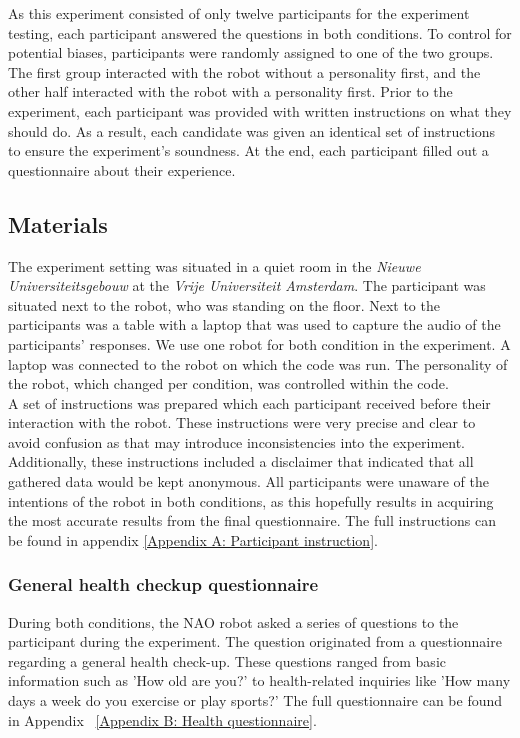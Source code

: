 \documentclass[runningheads]{llncs}
\begin{document}
As this experiment consisted of only twelve participants for the experiment testing, each participant answered the questions in both conditions. To control for potential biases, participants were randomly assigned to one of the two groups. The first group interacted with the robot without a personality first, and the other half interacted with the robot with a personality first. Prior to the experiment, each participant was provided with written instructions on what they should do. As a result, each candidate was given an identical set of instructions to ensure the experiment's soundness. At the end, each participant filled out a questionnaire about their experience. 

\subsection{Materials}
The experiment setting was situated in a quiet room in the \textit{Nieuwe Universiteitsgebouw} at the \textit{Vrije Universiteit Amsterdam}. The participant was situated next to the robot, who was standing on the floor. Next to the participants was a table with a laptop that was used to capture the audio of the participants' responses. We use one robot for both condition in the experiment. A laptop was connected to the robot on which the code was run. The personality of the robot, which changed per condition, was controlled within the code.\\

A set of instructions was prepared which each participant received before their interaction with the robot. These instructions were very precise and clear to avoid confusion as that may introduce inconsistencies into the experiment. Additionally, these instructions included a disclaimer that indicated that all gathered data would be kept anonymous. All participants were unaware of the intentions of the robot in both conditions, as this hopefully results in acquiring the most accurate results from the final questionnaire. The full instructions can be found in appendix \ref{Appendix A: Participant instruction}.\\

\subsubsection{General health checkup questionnaire}
During both conditions, the NAO robot asked a series of questions to the participant during the experiment. The question originated from a questionnaire regarding a general health check-up. These questions ranged from basic information such as 'How old are you?' to health-related inquiries like 'How many days a week do you exercise or play sports?' The full questionnaire can be found in Appendix ~\ref{Appendix B: Health questionnaire}.
\end{document}
